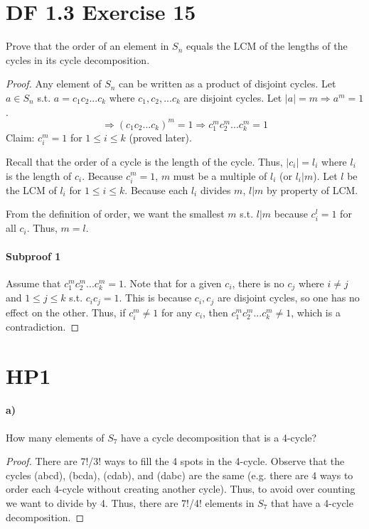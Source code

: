 \documentclass{article}
\begin{document}
\section{DF 1.3 Exercise 15}
Prove that the order of an element in $S_n$ equals the LCM of the lengths of the cycles in its cycle decomposition.
\begin{proof}
Any element of $S_n$ can be written as a product of disjoint cycles. Let $a \in S_n$ s.t. $a=c_1c_2...c_k$ where $c_1, c_2, ... c_k$ are disjoint cycles. Let $|a| = m \Rightarrow a^m = 1$.
\[\Rightarrow (c_1c_2...c_k)^m = 1 \Rightarrow c_1^m c_2^m ... c_k^m = 1\]
Claim: $c_i^m = 1$ for $1 \leq i \leq k$ (proved later).

Recall that the order of a cycle is the length of the cycle. Thus, $|c_i|=l_i$ where $l_i$ is the length of $c_i$. Because $c_i^m=1$, $m$ must be a multiple of $l_i$ (or $l_i|m$).
Let $l$ be the LCM of $l_i$ for $1 \leq i \leq k$. Because each $l_i$ divides $m$, $l|m$ by property of LCM.

From the definition of order, we want the smallest $m$ s.t. $l|m$ because $c_i^l=1$ for all $c_i$. Thus, $m=l$. 

\paragraph{Subproof 1}
Assume that $c_1^m c_2^m ... c_k^m = 1$. Note that for a given $c_i$, there is no $c_j$ where $i \neq j$ and $1 \leq j \leq k$ s.t. $c_i c_j = 1$. This is because $c_i, c_j$ are disjoint cycles, so one has no effect on the other. Thus, if $c_i^m \neq 1$ for any $c_i$, then $c_1^m c_2^m ... c_k^m \neq 1$, which is a contradiction.
\end{proof}

\section{HP1}
\paragraph{a)}
How many elements of $S_7$ have a cycle decomposition that is a 4-cycle?
\begin{proof}
There are 7!/3! ways to fill the 4 spots in the 4-cycle. Observe that the cycles (abcd), (bcda), (cdab), and (dabc) are the same (e.g. there are 4 ways to order each 4-cycle without creating another cycle). Thus, to avoid over counting we want to divide by 4. Thus, there are 7!/4! elements in $S_7$ that have a 4-cycle decomposition.
\end{proof}
\end{document}
